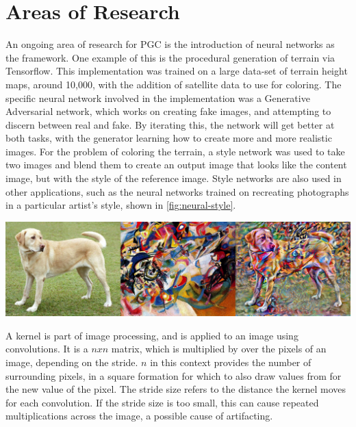 \documentclass[10pt]{report}
\begin{document}

		\section{Areas of Research}
	
		An ongoing area of research for PGC is the introduction of neural networks as the framework. One example of this is the procedural generation of terrain via Tensorflow. This implementation was trained on a large data-set of terrain height maps, around 10,000, with the addition of satellite data to use for coloring. The specific neural network involved in the implementation was a Generative Adversarial network\cite{goodfellow2014generative}, which works on creating fake images, and attempting to discern between real and fake. By iterating this, the network will get better at both tasks, with the generator learning how to create more and more realistic images. For the problem of coloring the terrain, a style network was used to take two images and blend them to create an output image that looks like the content image, but with the style of the reference image. Style networks are also used in other applications, such as the neural networks trained on recreating photographs in a particular artist's style, shown in \autoref{fig:neural-style}. 
		
		\begin{minipage}{\textwidth}
			\centering
			\includegraphics[scale=.3]{stylized-image}
			\label{fig:neural-style}
		\end{minipage}
	
		A kernel is part of image processing, and is applied to an image using convolutions. It is a \(n x n\) matrix, which is multiplied by over the pixels of an image, depending on the stride. \(n\) in this context provides the number of surrounding pixels, in a square formation for which to also draw values from for the new value of the pixel. The stride size refers to the distance the kernel moves for each convolution. If the stride size is too small, this can cause repeated multiplications across the image, a possible cause of artifacting. 
	
\end{document}

